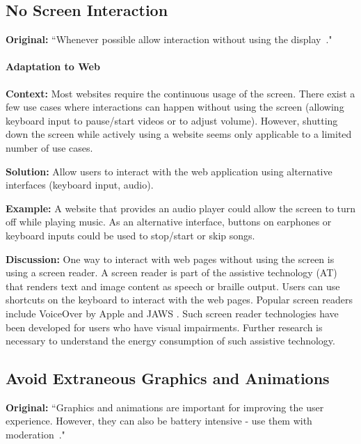 \subsection{No Screen Interaction} \label{sec:patterns-NoScreenInteraction}
\textbf{Original:} ``Whenever possible allow interaction without using the display~\cite{cruz2019catalog}."

\paragraph{Adaptation to Web}\mbox{}

\textbf{Context:} Most websites require the continuous usage of the screen. There exist a few use cases where interactions can happen without using the screen (\eg allowing keyboard input to pause/start videos or to adjust volume). However, shutting down the screen while actively using a website seems only applicable to a limited number of use cases.

\textbf{Solution:} Allow users to interact with the web application using alternative interfaces (\eg keyboard input, audio).

\textbf{Example:} A website that provides an audio player could allow the screen to turn off while playing music. As an alternative interface, buttons on earphones or keyboard inputs could be used to stop/start or skip songs.

\textbf{Discussion:} One way to interact with web pages without using the screen is using a screen reader. A screen reader is part of the assistive technology (AT) that renders text and image content as speech or braille output. Users can use shortcuts on the keyboard to interact with the web pages. Popular screen readers include VoiceOver by Apple \cite{VoiceOver-Apple} and JAWS \cite{JAWS}. Such screen reader technologies have been developed for users who have visual impairments. Further research is necessary to understand the energy consumption of such assistive technology.



\subsection{Avoid Extraneous Graphics and Animations} \label{sec:patterns-AvoidExtraneousGraphicsAndAnimations}
\textbf{Original:} ``Graphics and animations are important for improving the user experience. However, they can also be battery intensive - use them with moderation~\cite{cruz2019catalog}."

